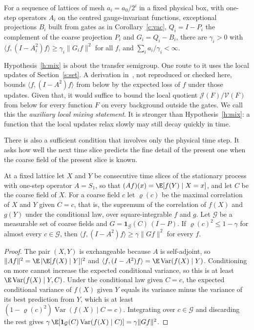 \begin{hypothesis}\label{h:mix}
For a sequence of lattices of mesh $a_i=a_0/2^i$ in a fixed physical box, with one-step operators $A_i$ on the
centred gauge-invariant functions, exceptional projections $B_i$ built from gates as in Corollary~\ref{c:vac},
$Q_i=I-P_i$ the complement of the coarse projection $P_i$ and $G_i=Q_i-B_i$, there are $\gamma_i>0$ with $\langle f,(I-A_i^2)f\rangle\ge\gamma_i\|G_if\|^2$ for all $f$, and
$\sum_ia_i/\gamma_i<\infty$.
\end{hypothesis}

Hypothesis~\ref{h:mix} is about the transfer semigroup. One route to it uses the local updates of
Section~\ref{s:set}. A derivation in~\cite{RepoInh}, not reproduced or checked here, bounds
$\langle f,(I-A^2)f\rangle$ from below by the expected loss of $f$ under those updates. Given that, it would
suffice to bound the local quotient $\mathcal J(F)/\mathcal V(F)$ from below for every function $F$ on every
background outside the gates. We call this the \emph{auxiliary local mixing statement}. It is stronger than
Hypothesis~\ref{h:mix}: a function that the local updates relax slowly may still decay quickly in time.

There is also a sufficient condition that involves only the physical time step. It asks how well the next
time slice predicts the fine detail of the present one when the coarse field of the present slice is known.

\begin{proposition}\label{p:pred}
At a fixed lattice let $X$ and $Y$ be consecutive time slices of the stationary process with one-step operator
$A=S_1$, so that $(Af)(x)=\E[f(Y)\mid X=x]$, and let $C$ be the coarse field of $X$. For a coarse field $c$ let
$\varrho(c)$ be the maximal correlation of $X$ and $Y$ given $C=c$, that is, the supremum of the correlation
of $f(X)$ and $g(Y)$ under the conditional law, over square-integrable $f$ and $g$. Let $\mathcal G$ be a
measurable set of coarse fields and $G=\mathbf 1_{\mathcal G}(C)\,(I-P)$. If $\varrho(c)^2\le1-\gamma$ for
almost every $c\in\mathcal G$, then $\langle f,(I-A^2)f\rangle\ge\gamma\|Gf\|^2$ for every $f$.
\end{proposition}
\begin{proof}
The pair $(X,Y)$ is exchangeable because $A$ is self-adjoint, so $\|Af\|^2=\E\,|\E[f(X)\mid Y]|^2$ and
$\langle f,(I-A^2)f\rangle=\E\operatorname{Var}(f(X)\mid Y)$. Conditioning on more cannot increase the expected
conditional variance, so this is at least $\E\operatorname{Var}(f(X)\mid Y,C)$. Under the conditional law given
$C=c$, the expected conditional variance of $f(X)$ given $Y$ equals its variance minus the variance of its
best prediction from $Y$, which is at least $(1-\varrho(c)^2)\operatorname{Var}(f(X)\mid C=c)$. Integrating
over $c\in\mathcal G$ and discarding the rest gives
$\gamma\,\E[\mathbf 1_{\mathcal G}(C)\operatorname{Var}(f(X)\mid C)]=\gamma\|Gf\|^2$.
\end{proof}


